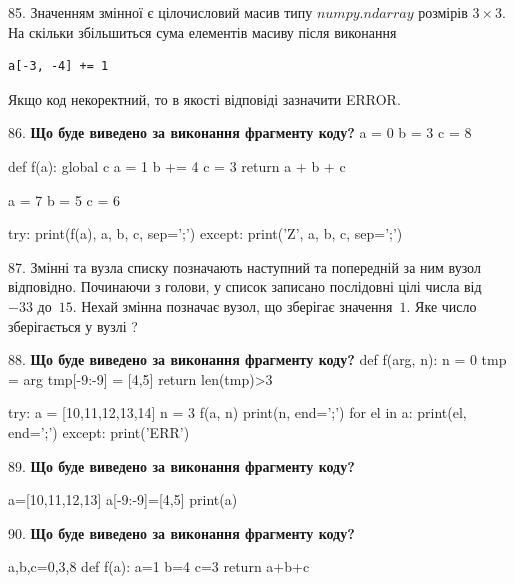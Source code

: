 \documentclass[11pt]{article}
\begin{document}
85. 
Значенням змінної  є цілочисловий масив типу $numpy.ndarray$ розмірів $3{\times}3$. На скільки збільшиться сума елементів масиву  після виконання
\begin{verbatim}
a[-3, -4] += 1
\end{verbatim}


Якщо код некоректний, то в якості відповіді зазначити ERROR.


\par\vspace{5mm}

86. \textbf{Що буде виведено за виконання фрагменту коду?}
a = 0
b = 3
c = 8

def f(a):
global c    a = 1
    b += 4
    c = 3
    return a + b + c

a = 7
b = 5
c = 6

try:
    print(f(a), a, b, c, sep=';')
except:
    print('Z', a, b, c, sep=';')
\par\vspace{5mm}

87. 
Змінні  та  вузла списку позначають наступний та попередній за ним вузол відповідно. Починаючи з голови, у список записано послідовні цілі числа від~$-33$ до~$15$. Нехай змінна  позначає вузол, що зберігає значення~$1$.
Яке число зберігається у вузлі  ?
\par\vspace{5mm}

88. \textbf{Що буде виведено за виконання фрагменту коду?}
def f(arg, n):
    n = 0
    tmp = arg
    tmp[-9:-9] = [4,5]
    return len(tmp)>3

try:
    a = [10,11,12,13,14]
    n = 3
    f(a, n)
    print(n, end=';')
    for el in a:
        print(el, end=';')
except:
    print('ERR')
\par\vspace{5mm}

89. \textbf{Що буде виведено за виконання фрагменту коду?}

a=[10,11,12,13]
a[-9:-9]=[4,5]
print(a)

\par\vspace{5mm}

90. \textbf{Що буде виведено за виконання фрагменту коду?}

a,b,c=0,3,8
def f(a):
    a=1
    b=4
    c=3
    return a+b+c
\end{document}
